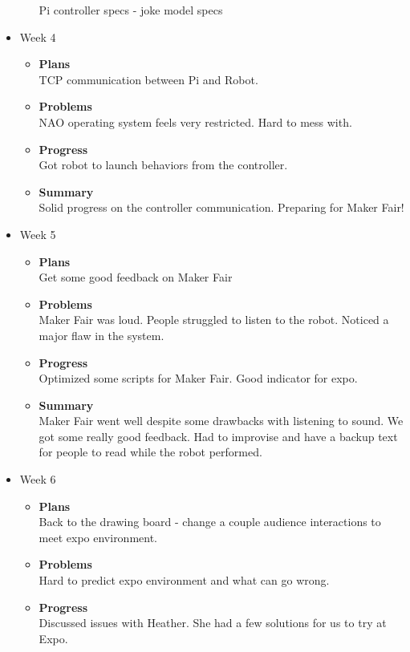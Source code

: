 \begin{itemize}
\begin{itemize}
				Pi controller specs - joke model specs
			\end{itemize}
		\item{Week 4}
			\begin{itemize}
				\item \textbf{Plans} \\
				TCP communication between Pi and Robot.
				\item \textbf{Problems} \\
				NAO operating system feels very restricted. Hard to mess with.
				\item \textbf{Progress} \\
				Got robot to launch behaviors from the controller.
				\item \textbf{Summary} \\
				Solid progress on the controller communication. Preparing for Maker Fair! 
			\end{itemize}
		\item{Week 5}
			\begin{itemize}
				\item \textbf{Plans} \\
				Get some good feedback on Maker Fair
				\item \textbf{Problems} \\
				Maker Fair was loud. People struggled to listen to the robot. Noticed a major flaw in the system.
				\item \textbf{Progress} \\
				Optimized some scripts for Maker Fair. Good indicator for expo.
				\item \textbf{Summary} \\
				Maker Fair went well despite some drawbacks with listening to sound. We got some really good feedback. Had to improvise and have a backup text for people to read while the robot performed.
			\end{itemize}
		\item{Week 6}
			\begin{itemize}
				\item \textbf{Plans} \\
				Back to the drawing board - change a couple audience interactions to meet expo environment.
				\item \textbf{Problems} \\
				Hard to predict expo environment and what can go wrong.
				\item \textbf{Progress} \\
				Discussed issues with Heather. She had a few solutions for us to try at Expo.

\end{itemize}
\end{itemize}
